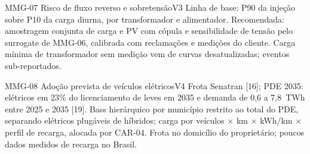 \begin{ficha}{MMG-07 \textperiodcentered{} Risco de fluxo reverso e sobretensão}{V3}
 Linha de base: P90 da injeção sobre P10 da carga diurna,
por transformador e alimentador. Recomendada: amostragem conjunta de carga e
PV com cópula e sensibilidade de tensão pelo surrogate de MMG-06, calibrada
com reclamações e medições do cliente.
 Carga mínima de transformador sem medição vem de curvas
desatualizadas; eventos sub-reportados.
\end{ficha}

\begin{ficha}{MMG-08 \textperiodcentered{} Adoção prevista de veículos elétricos}{V4}
 Frota Senatran [16]; PDE 2035: elétricos em 23\% do
licenciamento de leves em 2035 e demanda de 0,6 a 7,8~TWh entre 2025 e 2035
[19].
 Bass hierárquico por município restrito ao total do PDE,
separando elétricos plugáveis de híbridos; carga por veículos × km × kWh/km ×
perfil de recarga, alocada por CAR-04.
 Frota no domicílio do proprietário; poucos dados medidos
de recarga no Brasil.
\end{ficha}

